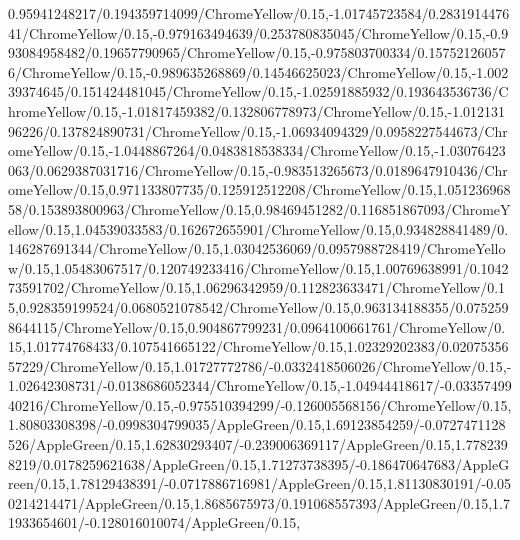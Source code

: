 {\begin{tikzternal}
{0.95941248217/0.194359714099/ChromeYellow/0.15,-1.01745723584/0.283191447641/ChromeYellow/0.15,-0.979163494639/0.253780835045/ChromeYellow/0.15,-0.993084958482/0.19657790965/ChromeYellow/0.15,-0.975803700334/0.157521260576/ChromeYellow/0.15,-0.989635268869/0.14546625023/ChromeYellow/0.15,-1.00239374645/0.151424481045/ChromeYellow/0.15,-1.02591885932/0.193643536736/ChromeYellow/0.15,-1.01817459382/0.132806778973/ChromeYellow/0.15,-1.01213196226/0.137824890731/ChromeYellow/0.15,-1.06934094329/0.0958227544673/ChromeYellow/0.15,-1.0448867264/0.0483818538334/ChromeYellow/0.15,-1.03076423063/0.0629387031716/ChromeYellow/0.15,-0.983513265673/0.0189647910436/ChromeYellow/0.15,0.971133807735/0.125912512208/ChromeYellow/0.15,1.05123696858/0.153893800963/ChromeYellow/0.15,0.98469451282/0.116851867093/ChromeYellow/0.15,1.04539033583/0.162672655901/ChromeYellow/0.15,0.934828841489/0.146287691344/ChromeYellow/0.15,1.03042536069/0.0957988728419/ChromeYellow/0.15,1.05483067517/0.120749233416/ChromeYellow/0.15,1.00769638991/0.104273591702/ChromeYellow/0.15,1.06296342959/0.112823633471/ChromeYellow/0.15,0.928359199524/0.0680521078542/ChromeYellow/0.15,0.963134188355/0.0752598644115/ChromeYellow/0.15,0.904867799231/0.0964100661761/ChromeYellow/0.15,1.01774768433/0.107541665122/ChromeYellow/0.15,1.02329202383/0.0207535657229/ChromeYellow/0.15,1.01727772786/-0.0332418506026/ChromeYellow/0.15,-1.02642308731/-0.0138686052344/ChromeYellow/0.15,-1.04944418617/-0.0335749940216/ChromeYellow/0.15,-0.975510394299/-0.126005568156/ChromeYellow/0.15,1.80803308398/-0.0998304799035/AppleGreen/0.15,1.69123854259/-0.0727471128526/AppleGreen/0.15,1.62830293407/-0.239006369117/AppleGreen/0.15,1.7782398219/0.0178259621638/AppleGreen/0.15,1.71273738395/-0.186470647683/AppleGreen/0.15,1.78129438391/-0.0717886716981/AppleGreen/0.15,1.81130830191/-0.050214214471/AppleGreen/0.15,1.8685675973/0.191068557393/AppleGreen/0.15,1.71933654601/-0.128016010074/AppleGreen/0.15,
}
\end{tikzternal}}
